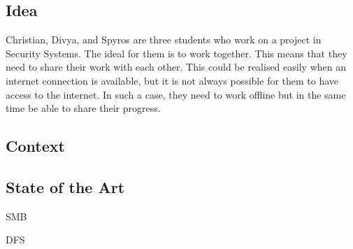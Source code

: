 
\subsection{Idea}

Christian, Divya, and Spyros are three students who work on a project in Security Systems. The ideal for them is to work together. This means that they need to share their work with each other. This could be realised easily when an internet connection is available, but it is not always possible for them to have access to the internet. In such a case, they need to work offline but in the same time be able to share their progress.

\subsection{Context}

\subsection{State of the Art}

SMB

DFS